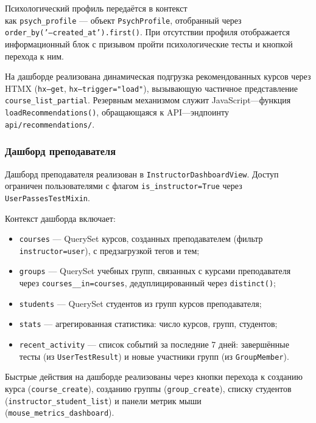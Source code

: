 Психологический профиль передаётся в контекст \\как 
\texttt{psych\_profile} --- объект \texttt{PsychProfile}, отобранный 
через\\ \texttt{order\_by('---created\_at').first()}. При отсутствии 
профиля отображается информационный блок с призывом пройти 
психологические тесты и кнопкой перехода к ним.

На дашборде реализована динамическая 
подгрузка рекомендованных курсов через HTMX (\texttt{hx---get}, 
\texttt{hx---trigger="load"}), вызывающую частичное представление 
\texttt{course\_list\_partial}. Резервным механизмом служит 
JavaScript---функция \texttt{loadRecommendations()}, обращающаяся к 
API---эндпоинту \texttt{api/recommendations/}.

\subsubsection{Дашборд преподавателя}

Дашборд преподавателя реализован в \texttt{InstructorDashboardView}. 
Доступ ограничен пользователями с флагом \texttt{is\_instructor=True} 
через \texttt{UserPassesTestMixin}.

Контекст дашборда включает:
\begin{itemize}
    \item \texttt{courses} --- QuerySet курсов, созданных преподавателем 
          (фильтр \texttt{instructor=user}), с предзагрузкой тегов и тем;
    \item \texttt{groups} --- QuerySet учебных групп, связанных с 
          курсами преподавателя через 
          \texttt{courses\_\_in=courses}, дедуплицированный через 
          \texttt{distinct()};
    \item \texttt{students} --- QuerySet студентов из групп курсов 
          преподавателя;
    \item \texttt{stats} --- агрегированная статистика: число курсов, 
          групп, студентов;
    \item \texttt{recent\_activity} --- список событий за последние 
          7 дней: завершённые тесты (из \texttt{UserTestResult}) 
          и новые участники групп (из \texttt{GroupMember}).
\end{itemize}

Быстрые действия на дашборде реализованы через кнопки перехода к 
созданию курса (\texttt{course\_create}), созданию группы 
(\texttt{group\_create}), списку студентов 
(\texttt{instructor\_student\_list}) и панели метрик мыши 
(\texttt{mouse\_metrics\_dashboard}).

